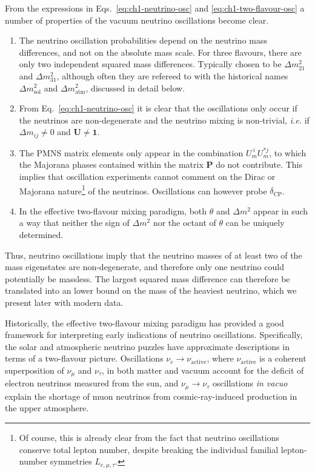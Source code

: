From the expressions in Eqs.~\eqref{eq:ch1-neutrino-osc} and
\eqref{eq:ch1-two-flavour-osc} a number of properties of the vacuum neutrino
oscillations become clear.
\begin{enumerate}
  \item The neutrino oscillation probabilities depend on the neutrino mass
    differences, and not on the absolute mass scale. For three flavours, there
    are only two independent squared mass differences. Typically chosen to be
    $\Delta m_{21}^{2}$ and $\Delta m_{31}^{2}$, although often they are
    refereed to with the historical names $\Delta m_{\text{sol}}^{2}$ and
    $\Delta m_{\text{atm}}^{2}$, discussed in detail below.
  \item From Eq.~\eqref{eq:ch1-neutrino-osc} it is clear that the oscillations only
    occur if the neutrinos are non-degenerate and the neutrino mixing is
    non-trivial, \textit{i.e.} if $\Delta m_{ij} \neq 0$ and
    $\mathbf{U} \neq \mathbf{1}$.
  \item The PMNS matrix elements only appear in the combination
    $U_{m}^{\ i} U_{m}^{* j}$, to which the Majorana phases contained within the
    matrix $\mathbf{P}$ do not contribute. This implies that oscillation
    experiments cannot comment on the Dirac or Majorana nature\footnote{Of
    course, this is already clear from the fact that neutrino oscillations
    conserve total lepton number, despite breaking the individual familial
    lepton-number symmetries $L_{e, \mu, \tau}$.} of the neutrinos. Oscillations
    can however probe $\delta_{\text{CP}}$.
  \item In the effective two-flavour mixing paradigm, both $\theta$ and
    $\Delta m^{2}$ appear in such a way that neither the sign of $\Delta m^{2}$
    nor the octant of $\theta$ can be uniquely determined.
  \end{enumerate}
  Thus, neutrino oscillations imply that the neutrino masses of at least two of
  the mass eigenstates are non-degenerate, and therefore only one neutrino could
  potentially be massless. The largest squared mass difference can therefore be
  translated into an lower bound on the mass of the heaviest neutrino, which we
  present later with modern data.

  Historically, the effective two-flavour mixing paradigm has provided a good
  framework for interpreting early indications of neutrino oscillations.
  Specifically, the solar and atmospheric neutrino puzzles have approximate
  descriptions in terms of a two-flavour picture. Oscillations
  $\nu_{e} \to \nu_{\text{active}}$, where $\nu_{\text{active}}$ is a coherent
  superposition of $\nu_{\mu}$ and $\nu_{\tau}$, in both matter and vacuum
  account for the deficit of electron neutrinos measured from the sun, and
  $\nu_{\mu} \to \nu_{\tau}$ oscillations \textit{in vacuo} explain the shortage
  of muon neutrinos from cosmic-ray-induced production in the upper atmosphere.

